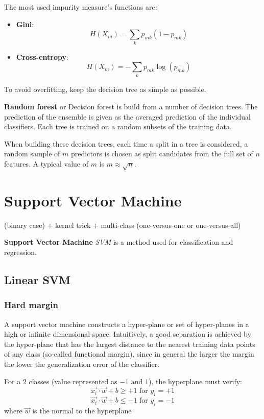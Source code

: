 The most used impurity measure's functions are:
\begin{itemize}
    \item \textbf{Gini}: $$H(X_m) = \sum_k p_{mk} (1 - p_{mk})$$
    \item \textbf{Cross-entropy}: $$ H(X_m) = - \sum_k p_{mk} \log(p_{mk}) $$
\end{itemize}

To avoid overfitting, keep the decision tree as simple as possible.

\textbf{Random forest} or Decision forest is build from a number of decision trees. The prediction of the ensemble is given as the averaged prediction of the individual classifiers. Each tree is trained on a random subsets of the training data.

When building these decision trees, each time a split in a tree is considered, a random sample of
$m$ predictors is chosen as split candidates from the full set of $n$ features. A typical value of $m$ is $m \approx \sqrt{n}$.

\section{Support Vector Machine}

 (binary case) + kernel trick + multi-class (one-versus-one or one-versus-all)

\textbf{Support Vector Machine} \textit{SVM} is a method used for classification and regression.

\subsection{Linear SVM}
\subsubsection{Hard margin}

A support vector machine constructs a hyper-plane or set of hyper-planes in a high or infinite dimensional space. Intuitively, a good separation is achieved by the hyper-plane that has the largest distance to the nearest training data points of any class (so-called functional margin), since in general the larger the margin the lower the generalization error of the classifier.

For a 2 classes (value represented as $-1$ and $1$), the hyperplane must verify:
\begin{equation}\label{eq:svm_1}
    \vec{x_i} \cdot \vec{w} + b \geq + 1 \text{ for } y_i = + 1
\end{equation}
\begin{equation}\label{eq:svm_2}
    \vec{x_i} \cdot \vec{w} + b \leq -1 \text{ for } y_i = - 1
\end{equation}
where $\vec{w}$ is the normal to the hyperplane

